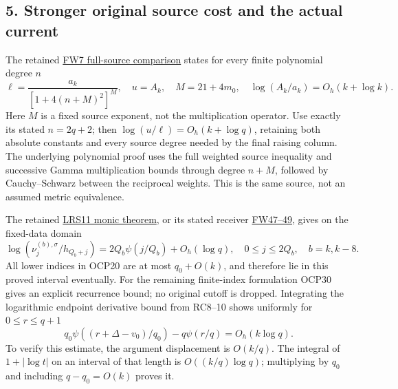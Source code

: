 \documentclass[10pt]{article}
\begin{document}
\subsection{5. Stronger original source cost and the actual current}\label{stronger-original-source-cost-and-the-actual-current}

The retained \href{https://github.com/KokunoYumeto/zeta-function-research-reader/blob/6cf5b3aa8ff395eba6b5512b28d117334da5767b/workbenches/splitzero-tandem/continuations/20260922-cutoff-profile/RETAINED_COMPLETE_PROOF_SOURCES.tex\#L120043}{FW7 full-source comparison} states for every finite polynomial degree \(n\) \[
\ell=\frac{a_k}{[1+4(n+M)^2]^M},\quad u=A_k,\quad M=21+4m_0,
\quad \log(A_k/a_k)=O_h(k+\log k).
\tag{RC22}
\] Here \(M\) is a fixed source exponent, not the multiplication operator. Use exactly its stated \(n=2q+2\); then \(\log(u/\ell)=O_h(k+\log q)\), retaining both absolute constants and every source degree needed by the final raising column. The underlying polynomial proof uses the full weighted source inequality and successive Gamma multiplication bounds through degree \(n+M\), followed by Cauchy--Schwarz between the reciprocal weights. This is the same source, not an assumed metric equivalence.

The retained \href{https://github.com/KokunoYumeto/zeta-function-research-reader/blob/6cf5b3aa8ff395eba6b5512b28d117334da5767b/workbenches/splitzero-tandem/continuations/20260922-cutoff-profile/RETAINED_COMPLETE_PROOF_SOURCES.tex\#L83769}{LRS11 monic theorem}, or its stated receiver \href{https://github.com/KokunoYumeto/zeta-function-research-reader/blob/6cf5b3aa8ff395eba6b5512b28d117334da5767b/workbenches/splitzero-tandem/continuations/20260922-cutoff-profile/RETAINED_COMPLETE_PROOF_SOURCES.tex\#L120720}{FW47--49}, gives on the fixed-data domain \[
\log(\nu^{(b),\sigma}_j/h_{Q_b+j})
=2Q_b\psi(j/Q_b)+O_h(\log q),
\quad0\le j\le2Q_b,\quad b=k,k-8.
\tag{RC23}
\] All lower indices in OCP20 are at most \(q_0+O(k)\), and therefore lie in this proved interval eventually. For the remaining finite-index formulation OCP30 gives an explicit recurrence bound; no original cutoff is dropped. Integrating the logarithmic endpoint derivative bound from RC8--10 shows uniformly for \(0\le r\le q+1\) \[
q_0\psi((r+\Delta-v_0)/q_0)-q\psi(r/q)=O_h(k\log q).
\tag{RC24}
\] To verify this estimate, the argument displacement is \(O(k/q)\). The integral of \(1+|\log t|\) on an interval of that length is \(O((k/q)\log q)\); multiplying by \(q_0\) and including \(q-q_0=O(k)\) proves it.
\end{document}
